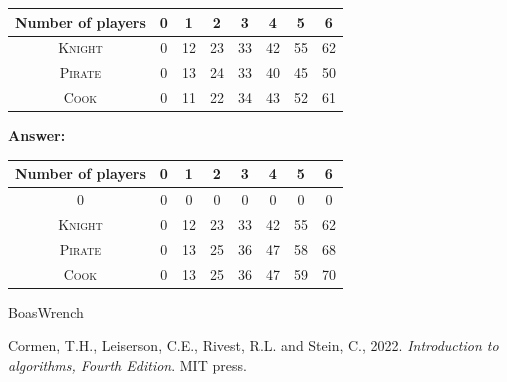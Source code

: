 \documentclass[dvipsnames]{article}
\begin{document}
\begin{enumerate}
\begin{enumerate}
  \begin{center}
    \begin{tabular}{ |c||c|c|c|c|c|c|c| }
      \hline
      Number of players & 0 & 1 & 2 & 3 & 4 & 5 & 6 \\
      \hline
      \hline
      \textsc{Knight} & 0   & 12  & 23  & 33  & 42  & 55 & 62 \\
      \hline
      \textsc{Pirate} & 0   & 13  & 24  & 33  & 40  & 45 & 50 \\
      \hline
      \textsc{Cook}   & 0   & 11  & 22  & 34  & 43  & 52 & 61 \\
      \hline
    \end{tabular}
  \end{center}

  \color{blue}
  \textbf{Answer:}\\
  \begin{center}
    \begin{tabular}{ |c||c|c|c|c|c|c|c| }
      \hline
      Number of players & 0 & 1 & 2 & 3 & 4 & 5 & 6 \\
      \hline
      \hline
      \textsc 0 & 0   & 0  & 0  & 0  & 0  & 0 & 0 \\
      \hline
      \textsc{Knight} & 0   & 12  & 23  & 33  & 42  & 55 & 62 \\
      \hline
      \textsc{Pirate} & 0   & 13  & 25  & 36  & 47  & 58 & 68 \\
      \hline
      \textsc{Cook}   & 0   & 13  & 25  & 36  & 47  & 59 & 70 \\
      \hline
    \end{tabular}
  \end{center}
  \color{black}

\end{enumerate}
\end{enumerate}

\begin{thebibliography}{BoasWrench}

Cormen, T.H., Leiserson, C.E., Rivest, R.L. and Stein, C., 2022. \emph{Introduction to algorithms, Fourth Edition}. MIT press.

\end{thebibliography}
\end{document}
